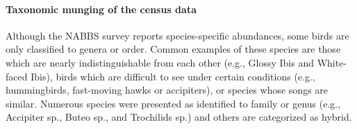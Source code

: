 \documentclass[12pt,twoside,openany]{reedthesis}
\begin{document}
\hypertarget{taxonomic-munging-of-the-census-data}{%
\paragraph{Taxonomic munging of the census data}\label{taxonomic-munging-of-the-census-data}}

Although the NABBS survey reports species-specific abundances, some birds are only classified to genera or order. Common examples of these species are those which are nearly indistinguishable from each other (e.g., Glossy Ibis and White-faced Ibis), birds which are difficult to see under certain conditions (e.g., hummingbirds, fast-moving hawks or accipiters), or species whose songs are similar. Numerous species were presented as identified to family or genus (e.g., Accipiter sp., Buteo sp., and Trochilids sp.) and others are categorized as hybrid.
\end{document}
